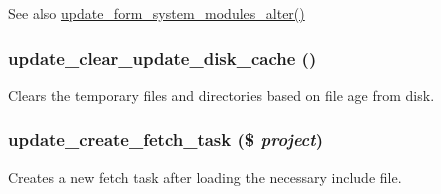 \begin{DoxySeeAlso}{See also}
\hyperlink{update_8module_ac66abd85c8fc901932b73f874bee871b}{update\_\-form\_\-system\_\-modules\_\-alter()} 
\end{DoxySeeAlso}
\hypertarget{update_8module_a8983ea011eb38001c6265043b2c793d2}{
\subsubsection[{update\_\-clear\_\-update\_\-disk\_\-cache}]{\setlength{\rightskip}{0pt plus 5cm}update\_\-clear\_\-update\_\-disk\_\-cache ()}}
\label{update_8module_a8983ea011eb38001c6265043b2c793d2}
Clears the temporary files and directories based on file age from disk. \hypertarget{update_8module_abec25d4ee05c73f9417a4eb6e582351d}{
\subsubsection[{update\_\-create\_\-fetch\_\-task}]{\setlength{\rightskip}{0pt plus 5cm}update\_\-create\_\-fetch\_\-task (\$ {\em project})}}
\label{update_8module_abec25d4ee05c73f9417a4eb6e582351d}
Creates a new fetch task after loading the necessary include file.


